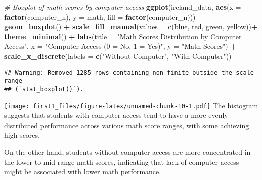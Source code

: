 \documentclass[
]{article}
\newenvironment{Shaded}{\begin{snugshade}}{\end{snugshade}}
\newcommand{\AttributeTok}[1]{\textcolor[rgb]{0.13,0.29,0.53}{#1}}
\newcommand{\CommentTok}[1]{\textcolor[rgb]{0.56,0.35,0.01}{\textit{#1}}}
\newcommand{\FunctionTok}[1]{\textcolor[rgb]{0.13,0.29,0.53}{\textbf{#1}}}
\newcommand{\NormalTok}[1]{#1}
\newcommand{\SpecialCharTok}[1]{\textcolor[rgb]{0.81,0.36,0.00}{\textbf{#1}}}
\newcommand{\StringTok}[1]{\textcolor[rgb]{0.31,0.60,0.02}{#1}}
\begin{document}
\begin{Shaded}
\begin{Highlighting}[]
\CommentTok{\# Boxplot of math scores by computer access}
\FunctionTok{ggplot}\NormalTok{(ireland\_data, }\FunctionTok{aes}\NormalTok{(}\AttributeTok{x =} \FunctionTok{factor}\NormalTok{(computer\_n), }\AttributeTok{y =}\NormalTok{ math, }\AttributeTok{fill =} \FunctionTok{factor}\NormalTok{(computer\_n))) }\SpecialCharTok{+}
  \FunctionTok{geom\_boxplot}\NormalTok{() }\SpecialCharTok{+}
  \FunctionTok{scale\_fill\_manual}\NormalTok{(}\AttributeTok{values =} \FunctionTok{c}\NormalTok{(}\StringTok{\textquotesingle{}blue\textquotesingle{}}\NormalTok{, }\StringTok{\textquotesingle{}red\textquotesingle{}}\NormalTok{, }\StringTok{\textquotesingle{}green\textquotesingle{}}\NormalTok{, }\StringTok{\textquotesingle{}yellow\textquotesingle{}}\NormalTok{))}\SpecialCharTok{+}
  \FunctionTok{theme\_minimal}\NormalTok{() }\SpecialCharTok{+}
  \FunctionTok{labs}\NormalTok{(}\AttributeTok{title =} \StringTok{"Math Scores Distribution by Computer Access"}\NormalTok{,}
       \AttributeTok{x =} \StringTok{"Computer Access (0 = No, 1 = Yes)"}\NormalTok{,}
       \AttributeTok{y =} \StringTok{"Math Scores"}\NormalTok{) }\SpecialCharTok{+}
  \FunctionTok{scale\_x\_discrete}\NormalTok{(}\AttributeTok{labels =} \FunctionTok{c}\NormalTok{(}\StringTok{"Without Computer"}\NormalTok{, }\StringTok{"With Computer"}\NormalTok{))}
\end{Highlighting}
\end{Shaded}

\begin{verbatim}
## Warning: Removed 1285 rows containing non-finite outside the scale range
## (`stat_boxplot()`).
\end{verbatim}

\texttt{[image: first1\_files/figure-latex/unnamed-chunk-10-1.pdf]} The
histogram suggests that students with computer access tend to have a
more evenly distributed performance across various math score ranges,
with some achieving high scores.

On the other hand, students without computer access are more
concentrated in the lower to mid-range math scores, indicating that lack
of computer access might be associated with lower math performance.
\end{document}
